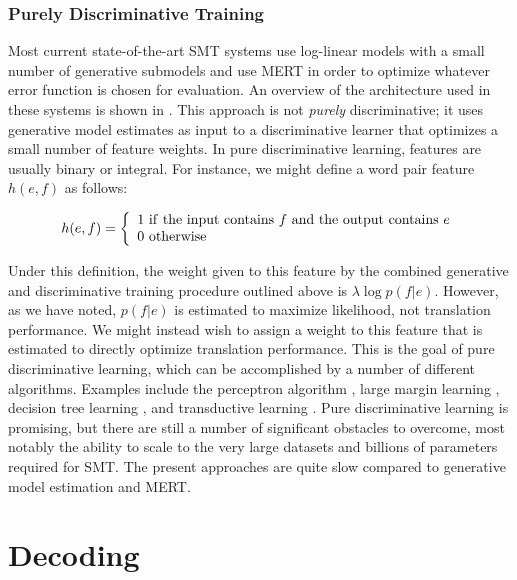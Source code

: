 \subsubsection{Purely Discriminative Training}\label{sec:pure-discriminative}

Most current state-of-the-art SMT systems use log-linear models
with a small number of generative submodels and use MERT in order 
to optimize whatever error function is chosen for evaluation.  
An overview of the architecture used in these systems is 
shown in .  This approach is not {\em purely}
discriminative; it uses generative model estimates as input
to a discriminative learner that optimizes a small number of 
feature weights.  In pure discriminative learning, 
features are usually binary or integral.  For instance, we might
define a word pair feature $h(e,f)$ as follows:

\begin{displaymath}
h(e,f) = \left\{\begin{array}{l}
1~{\rm if~the~input~contains~}f{\rm~and~the~output~contains}~e\\
0~{\rm otherwise}
\end{array}\right.
\end{displaymath}


\noindent Under this definition, the weight given
to this feature by the combined generative and discriminative 
training procedure outlined above is $\lambda\log p(f|e)$.  However,
as we have noted, $p(f|e)$ is estimated to maximize likelihood,
not translation performance.  We might instead wish to assign
a weight to this feature that is estimated to directly optimize
translation performance.  This is the goal of pure discriminative
learning, which can be accomplished by a number of different
algorithms.  Examples include the perceptron 
algorithm \citep{Liang:2006:acl-coling}, large margin learning
\citep{Tillman:2006:acl-coling,Watanabe:2007:emnlp-conll}, decision tree learning
\citep{Wellington:2006:amta}, and transductive learning 
\citep{Ueffing:2007:acl}.  Pure discriminative
learning is promising, but there are still a number of significant
obstacles to overcome, most notably the ability to scale to
the very large datasets and billions of parameters required for SMT.  The
present approaches are quite slow compared to generative model estimation
and MERT.


\section{Decoding}\label{sec:decoding}

